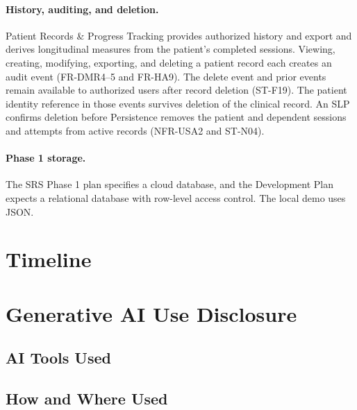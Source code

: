 \documentclass[12pt, titlepage]{article}
\begin{document}
\paragraph{History, auditing, and deletion.}
Patient Records \& Progress Tracking provides authorized history and export
and derives longitudinal measures from the patient's completed sessions.
Viewing, creating, modifying, exporting, and deleting a patient record each
creates an audit event (FR-DMR4--5 and FR-HA9). The delete event and prior
events remain available to authorized users after record deletion (ST-F19).
The patient identity reference in those events survives deletion of the
clinical record. An SLP confirms deletion before Persistence removes the
patient and dependent sessions and attempts from active records
(NFR-USA2 and ST-N04).

\paragraph{Phase 1 storage.}
The SRS Phase 1 plan specifies a cloud database, and the Development Plan
expects a relational database with row-level access control. The local demo
uses JSON.

\section{Timeline}



\section{Generative AI Use Disclosure}


\subsection{AI Tools Used}


\subsection{How and Where Used}
\end{document}
